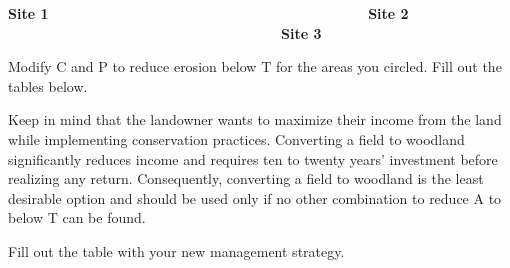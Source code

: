 \documentclass[
  letterpaper,
  twocolumn,
  portrait]{scrbook}
\begin{document}
\textbf{Site 1}
~~~~~~~~~~~~~~~~~~~~~~~~~~~~~~~~~~~~~~~~~~~~~\textbf{Site 2} ~~~~~~
~~~~~~~~~~~~~~~~~~~~~~~~~~~~~~~~~~~~~~~\textbf{Site 3}

Modify C and P to reduce erosion below T for the areas you circled. Fill
out the tables below.

Keep in mind that the landowner wants to maximize their income from the
land while implementing conservation practices. Converting a field to
woodland significantly reduces income and requires ten to twenty years'
investment before realizing any return. Consequently, converting a field
to woodland is the least desirable option and should be used only if no
other combination to reduce A to below T can be found.

Fill out the table with your new management strategy.

 
  \providecommand{\huxb}[2]{\arrayrulecolor[RGB]{#1}\global\arrayrulewidth=#2pt}
  \providecommand{\huxvb}[2]{\color[RGB]{#1}\vrule width #2pt}
  \providecommand{\huxtpad}[1]{\rule{0pt}{#1}}
  \providecommand{\huxbpad}[1]{\rule[-#1]{0pt}{#1}}
\end{document}
